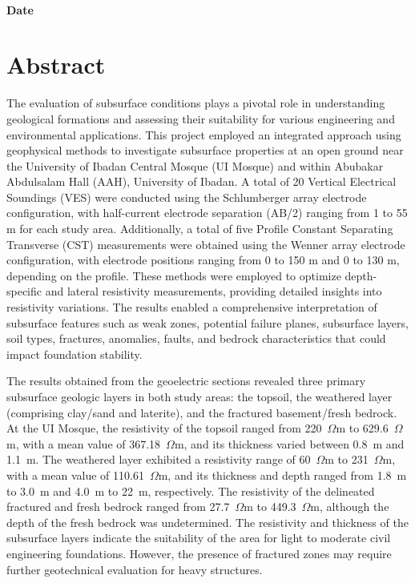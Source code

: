 \documentclass[12pt,a4paper]{report}
\begin{document}
\begin{center}
    \noindent\makebox[7cm]{\hrulefill}  \\  
    \textbf{Date}  
\end{center}

\chapter*{Abstract}
\justifying
The evaluation of subsurface conditions plays a pivotal role in understanding geological formations and assessing their suitability for various engineering and environmental applications. This project employed an integrated approach using geophysical methods to investigate subsurface properties at an open ground near the University of Ibadan Central Mosque (UI Mosque) and within Abubakar Abdulsalam Hall (AAH), University of Ibadan. A total of 20 Vertical Electrical Soundings (VES) were conducted using the Schlumberger array electrode configuration, with half-current electrode separation (AB/2) ranging from 1 to 55 m for each study area. Additionally, a total of five Profile Constant Separating Transverse (CST) measurements were obtained using the Wenner array electrode configuration, with electrode positions ranging from 0 to 150 m and 0 to 130 m, depending on the profile. These methods were employed to optimize depth-specific and lateral resistivity measurements, providing detailed insights into resistivity variations. The results enabled a comprehensive interpretation of subsurface features such as weak zones, potential failure planes, subsurface layers, soil types, fractures, anomalies, faults, and bedrock characteristics that could impact foundation stability.

The results obtained from the geoelectric sections revealed three primary subsurface geologic layers in both study areas: the topsoil, the weathered layer (comprising clay/sand and laterite), and the fractured basement/fresh bedrock. At the UI Mosque, the resistivity of the topsoil ranged from 220~$\Omega$m to 629.6~$\Omega$m, with a mean value of 367.18~$\Omega$m, and its thickness varied between 0.8~m and 1.1~m. The weathered layer exhibited a resistivity range of 60~$\Omega$m to 231~$\Omega$m, with a mean value of 110.61~$\Omega$m, and its thickness and depth ranged from 1.8~m to 3.0~m and 4.0~m to 22~m, respectively. The resistivity of the delineated fractured and fresh bedrock ranged from 27.7~$\Omega$m to 449.3~$\Omega$m, although the depth of the fresh bedrock was undetermined. The resistivity and thickness of the subsurface layers indicate the suitability of the area for light to moderate civil engineering foundations. However, the presence of fractured zones may require further geotechnical evaluation for heavy structures.
\end{document}
